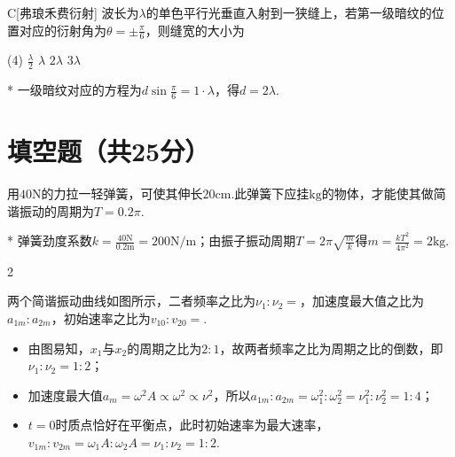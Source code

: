 \begin{choice}{C}[弗琅禾费衍射]
    波长为$\lambda$的单色平行光垂直入射到一狭缝上，若第一级暗纹的位置对应的衍射角为$\theta=\pm\frac{\pi}{6}$，则缝宽的大小为
    \begin{tasks}(4)
        \task $\frac{\lambda}{2}$
        \task $\lambda$
        \task $2\lambda$
        \task $3\lambda$
    \end{tasks}
\end{choice}
\begin{solution}*
    一级暗纹对应的方程为$d\sin\frac{\pi}{6}=1\cdot\lambda$，得$d=2\lambda$.
\end{solution}

\section{填空题（共25分）}

\begin{problem}[简谐振动][3]
    用$40\mathrm{N}$的力拉一轻弹簧，可使其伸长$20\mathrm{cm}$.此弹簧下应挂$\mathrm{kg}$的物体，才能使其做简谐振动的周期为$T=0.2\pi$.
\end{problem}
\begin{solution}*
    弹簧劲度系数$k=\frac{40\mathrm{N}}{0.2\mathrm{m}}=200\mathrm{N/m}$；由振子振动周期$T=2\pi\sqrt{\frac{m}{k}}$得$m=\frac{kT^2}{4\pi^2}=2\mathrm{kg}$.
\end{solution}

\begin{paracol}{2}
\begin{problem}[简谐振动][4]
    两个简谐振动曲线如图所示，二者频率之比为$\nu_1:\nu_2=$，加速度最大值之比为$a_{1m}:a_{2m}$，初始速率之比为$v_{10}:v_{20}=$.
\end{problem}    
    \switchcolumn\centering
    \vfill
    \vfill
\end{paracol}
\begin{solution}
    \begin{itemize}
        \item 由图易知，$x_1$与$x_2$的周期之比为$2:1$，故两者频率之比为周期之比的倒数，即$\nu_1:\nu_2=1:2$；
        \item 加速度最大值$a_m=\omega^2 A\propto\omega^2\propto\nu^2$，所以$a_{1m}:a_{2m}=\omega_1^2:\omega_2^2=\nu_1^2:\nu_2^2=1:4$；
        \item $t=0$时质点恰好在平衡点，此时初始速率为最大速率，$v_{1m}:v_{2m}=\omega_1A:\omega_2A=\nu_1:\nu_2=1:2$.
    \end{itemize}
\end{solution}

